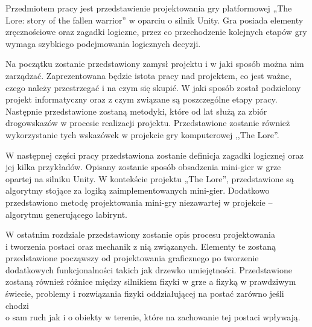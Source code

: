 \documentclass[oneside,polski,logo]{amuthesis}
\author{Kamil Tyrek, Mateusz Hypś, Jakub Kozubal}
\date{Poznań, luty 2021}
\begin{document}
\maketitle

\author{Kamil Tyrek}
\makestatement

\author{Mateusz Hypś}
\makestatement

\author{Jakub Kozubal}
\makestatement

\begin{streszczenie}
Przedmiotem pracy jest przedstawienie projektowania gry platformowej „The Lore: story of the fallen warrior” w oparciu o silnik Unity. Gra posiada elementy zręcznościowe oraz zagadki logiczne, przez co przechodzenie kolejnych etapów gry wymaga szybkiego podejmowania logicznych decyzji. \par
Na początku zostanie przedstawiony zamysł projektu i w jaki sposób można nim zarządzać. Zaprezentowana będzie istota pracy nad projektem, co jest ważne, czego należy przestrzegać i na czym się skupić. W jaki sposób został podzielony projekt informatyczny oraz z czym związane są poszczególne etapy pracy. Następnie przedstawione zostaną metodyki, które od lat służą za zbiór drogowskazów w procesie realizacji projektu. Przedstawione zostanie również wykorzystanie tych wskazówek w projekcie gry komputerowej ,,The Lore''. \par
W następnej części pracy przedstawiona zostanie definicja zagadki logicznej oraz jej kilka przykładów. Opisany zostanie sposób obsadzenia mini-gier w grze opartej na silniku Unity. W kontekście projektu „The Lore”, przedstawione są algorytmy stojące za logiką zaimplementowanych mini-gier. Dodatkowo przedstawiono metodę projektowania mini-gry niezawartej w projekcie – algorytmu generującego labirynt. \par
W ostatnim rozdziale przedstawiony zostanie opis procesu projektowania\\ i tworzenia postaci oraz mechanik z nią związanych. Elementy te zostaną przedstawione począwszy od projektowania graficznego po tworzenie dodatkowych funkcjonalności takich jak drzewko umiejętności. Przedstawione zostaną również różnice między silnikiem fizyki w grze a fizyką w prawdziwym świecie, problemy i rozwiązania fizyki oddziałującej na postać zarówno jeśli chodzi\\ o sam ruch jak i o obiekty w terenie, które na zachowanie tej postaci wpływają.
\end{streszczenie}
\tableofcontents
\end{document}
